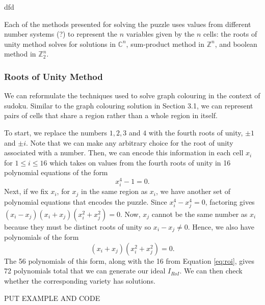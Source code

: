 \documentclass[../main.tex]{subfiles}
\begin{document}
            dfd

            Each of the methods presented for solving the puzzle uses values from different number systems ({\color{red}?}) to represent the $n$ variables given by the $n$ cells: the roots of unity method solves for solutions in $\mathbb{C}^n$, sum-product method in $\mathbb{Z}^n$, and boolean method in $\mathbb{Z}_2^n$.


        
        
            \subsubsection{Roots of Unity Method}

            We can reformulate the techniques used to solve graph colouring in the context of sudoku. Similar to the graph colouring solution in Section 3.1, we can represent pairs of cells that share a region rather than a whole region in itself. 
            
            To start, we replace the numbers $1,2,3$ and $4$ with the fourth roots of unity, $\pm 1$ and $\pm i$. Note that we can make any arbitrary choice for the root of unity associated with a number. Then, we can encode this information in each cell $x_i$ for $1\leq i\leq 16$ which takes on values from the fourth roots of unity in 16 polynomial equations of the form
            \begin{equation} 
                \label{eq:roi}
                x_i^4-1=0.
            \end{equation}
            Next, if we fix $x_i$, for $x_j$ in the same region as $x_i$, we have another set of polynomial equations that encodes the puzzle. Since $x_i^4-x_j^4=0$, factoring gives $(x_i-x_j)(x_i+x_j)(x_i^2+x_j^2)=0$. Now, $x_j$ cannot be the same number as $x_i$ because they must be distinct roots of unity so $x_i-x_j\neq0$. Hence, we also have polynomials of the form
            \begin{equation}
                \label{eq:roi factor}
                (x_i+x_j)(x_i^2+x_j^2)=0.
            \end{equation}
            The 56 polynomials of this form, along with the 16 from Equation \ref{eq:roi}, gives 72 polynomials total that we can generate our ideal $I_{RoI}$. We can then check whether the corresponding variety has solutions.

            {\color{red} PUT EXAMPLE AND CODE}
\end{document}
